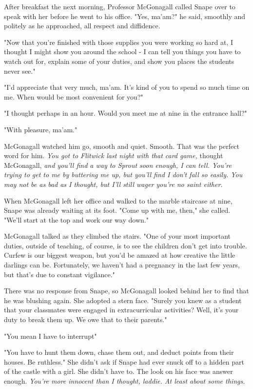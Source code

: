 After breakfast the next morning, Professor McGonagall called Snape over to speak with her before he went to his office. "Yes, ma'am?" he said, smoothly and politely as he approached, all respect and diffidence.

"Now that you're finished with those supplies you were working so hard at, I thought I might show you around the school - I can tell you things you have to watch out for, explain some of your duties, and show you places the students never see."

"I'd appreciate that very much, ma'am. It's kind of you to spend so much time on me. When would be most convenient for you?"

"I thought perhaps in an hour. Would you meet me at nine in the entrance hall?"

"With pleasure, ma'am."

McGonagall watched him go, smooth and quiet. Smooth. That was the perfect word for him. \emph{You got to Flitwick last night with that card game,} thought McGonagall, \emph{and you'll find a way to Sprout soon enough, I can tell. You're trying to get to me by buttering me up, but you'll find I don't fall so easily. You may not be as bad as I thought, but I'll still wager you're no saint either.}

When McGonagall left her office and walked to the marble staircase at nine, Snape was already waiting at its foot. "Come up with me, then," she called. "We'll start at the top and work our way down."

McGonagall talked as they climbed the stairs. "One of your most important duties, outside of teaching, of course, is to see the children don't get into trouble. Curfew is our biggest weapon, but you'd be amazed at how creative the little darlings can be. Fortunately, we haven't had a pregnancy in the last few years, but that's due to constant vigilance."

There was no response from Snape, so McGonagall looked behind her to find that he was blushing again. She adopted a stern face. "Surely you knew as a student that your classmates were engaged in extracurricular activities? Well, it's your duty to break them up. We owe that to their parents."

"You mean I have to interrupt{\el}"

"You have to hunt them down, chase them out, and deduct points from their houses. Be ruthless." She didn't ask if Snape had ever snuck off to a hidden part of the castle with a girl. She didn't have to. The look on his face was answer enough. \emph{You're more innocent than I thought, laddie. At least about some things.}

